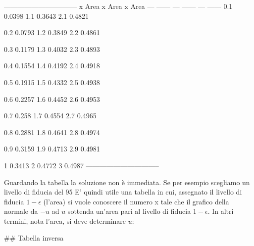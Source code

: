 \documentclass[onecolumn,12pt]{book}\usepackage[]{graphicx}\usepackage[]{color}
\newenvironment{knitrout}{}{} %
\begin{document}
\begin{knitrout}
\color{fgcolor}
--------------------------------
 x   Area   x   Area   x   Area 
--- ------ --- ------ --- ------
0.1 0.0398 1.1 0.3643 2.1 0.4821

0.2 0.0793 1.2 0.3849 2.2 0.4861

0.3 0.1179 1.3 0.4032 2.3 0.4893

0.4 0.1554 1.4 0.4192 2.4 0.4918

0.5 0.1915 1.5 0.4332 2.5 0.4938

0.6 0.2257 1.6 0.4452 2.6 0.4953

0.7 0.258  1.7 0.4554 2.7 0.4965

0.8 0.2881 1.8 0.4641 2.8 0.4974

0.9 0.3159 1.9 0.4713 2.9 0.4981

 1  0.3413  2  0.4772  3  0.4987
--------------------------------


\end{knitrout}
Guardando la tabella la soluzione non è  immediata. Se per esempio scegliamo un livello di fiducia del 95%
E' quindi utile una tabella in cui, assegnato il livello di fiducia $1-\epsilon$  (l'area) si vuole conoscere il numero  x tale che il grafico della normale da $-u$ ad $u$ sottenda un'area pari al livello di fiducia $1-\epsilon$. In altri termini, nota l'area, si deve determinare $u$:

## Tabella inversa 
\end{document}
